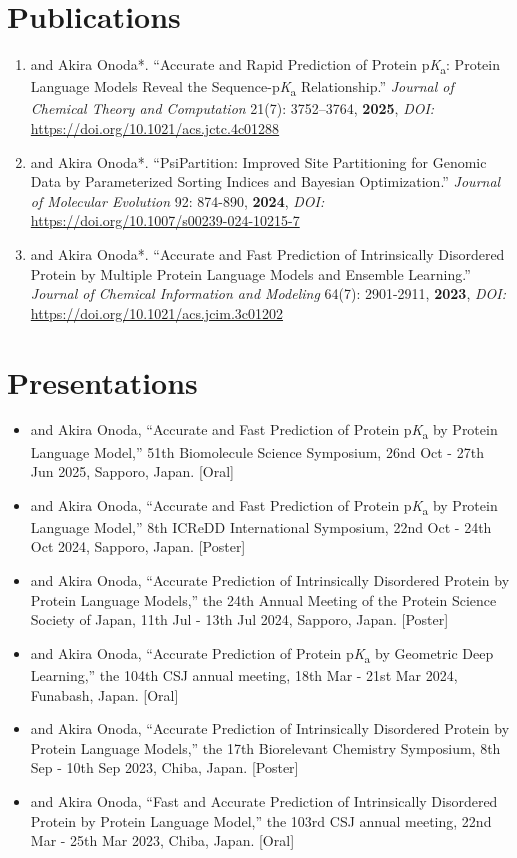 \documentclass[a4paper,11pt]{article}
\newcommand{\pKa}{p\textit{K}\textsubscript{a}}
\begin{document}
\section*{Publications}
\begin{enumerate}
    \item {} and Akira Onoda*. ``Accurate and Rapid Prediction of Protein \pKa{}: Protein Language Models Reveal the Sequence-\pKa{} Relationship.'' \textit{Journal of Chemical Theory and Computation} 21(7): 3752–3764, \textbf{2025}, \emph{DOI:} \url{https://doi.org/10.1021/acs.jctc.4c01288}
    \item {} and Akira Onoda*. ``PsiPartition: Improved Site Partitioning for Genomic Data by Parameterized Sorting Indices and Bayesian Optimization.'' \textit{Journal of Molecular Evolution} 92: 874-890, \textbf{2024}, \emph{DOI:} \url{https://doi.org/10.1007/s00239-024-10215-7}
    \item {} and Akira Onoda*. ``Accurate and Fast Prediction of Intrinsically Disordered Protein by Multiple Protein Language Models and Ensemble Learning.'' \textit{Journal of Chemical Information and Modeling} 64(7): 2901-2911, \textbf{2023}, \emph{DOI:} \url{https://doi.org/10.1021/acs.jcim.3c01202} 
    \end{enumerate}
\section*{Presentations}
\begin{itemize}
    \item {} and Akira Onoda, ``Accurate and Fast Prediction of Protein \pKa{} by Protein Language Model,'' 51th Biomolecule Science Symposium, 26nd Oct - 27th Jun 2025, Sapporo, Japan. [Oral]
    \item {} and Akira Onoda, ``Accurate and Fast Prediction of Protein \pKa{} by Protein Language Model,'' 8th ICReDD International Symposium, 22nd Oct - 24th Oct 2024, Sapporo, Japan. [Poster]
    \item {} and Akira Onoda, ``Accurate Prediction of Intrinsically Disordered Protein by Protein Language Models,'' the 24th Annual Meeting of the Protein Science Society of Japan, 11th Jul - 13th Jul 2024, Sapporo, Japan. [Poster]
    \item {} and Akira Onoda, ``Accurate Prediction of Protein \pKa{} by Geometric Deep Learning,'' the 104th CSJ annual meeting, 18th Mar - 21st Mar 2024, Funabash, Japan. [Oral]
    \item {} and Akira Onoda, ``Accurate Prediction of Intrinsically Disordered Protein by Protein Language Models,'' the 17th Biorelevant Chemistry Symposium, 8th Sep - 10th Sep 2023, Chiba, Japan. [Poster]
    \item {} and Akira Onoda, ``Fast and Accurate Prediction of Intrinsically Disordered Protein by Protein Language Model,'' the 103rd CSJ annual meeting, 22nd Mar - 25th Mar 2023, Chiba, Japan. [Oral] 
\end{itemize}
\end{document}
